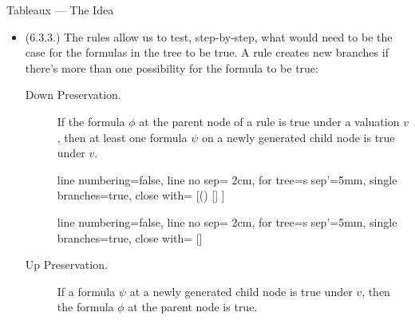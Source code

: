 \begin{frame}{Tableaux --- The Idea}

	\begin{itemize}
	
		\item (6.3.3.) The rules allow us to test, step-by-step, what would need to be the case for the formulas in the tree to be true. A rule creates new branches if there's more than one possibility for the formula to be true:
		
		\begin{description}
			
				\item[Down Preservation.] If the formula $\phi$ at the parent node of a rule is true under a valuation $v$, then at least one formula $\psi$ on a newly generated child node is true under $v$.
				
				\begin{center}{\tiny
					\begin{prooftree}
					{
					line numbering=false,
					line no sep= 2cm,
					for tree={s sep'=5mm},
					single branches=true,
					close with=\xmark
					}
					[\neg (\phi\to\psi) [\phi [\neg \psi ] ] ]
					\end{prooftree}
					\begin{prooftree}
					{
					line numbering=false,
					line no sep= 2cm,
					for tree={s sep'=5mm},
					single branches=true,
					close with=\xmark
					}
					[\phi\lor\psi [\phi ] [\psi ] ]
					\end{prooftree}}
				\end{center}
				
				\item[Up Preservation.] If a formula $\psi$ at a newly generated child node is true under $v$, then the formula $\phi$ at the parent node is true.
			
			\end{description}
	
	\end{itemize}

\end{frame}

